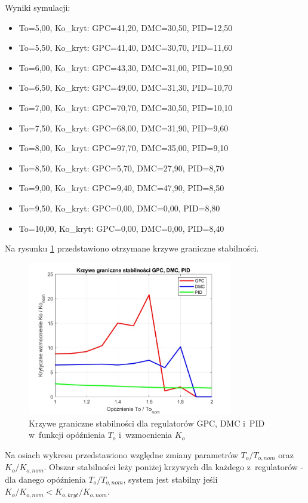 \documentclass[a4paper,titlepage,11pt,floatssmall]{mwrep}
\begin{document}
Wyniki symulacji:
\begin{itemize}
    \item To=5,00, Ko\_kryt: GPC=41,20, DMC=30,50, PID=12,50
    \item To=5,50, Ko\_kryt: GPC=41,40, DMC=30,70, PID=11,60
    \item To=6,00, Ko\_kryt: GPC=43,30, DMC=31,00, PID=10,90
    \item To=6,50, Ko\_kryt: GPC=49,00, DMC=31,30, PID=10,70
    \item To=7,00, Ko\_kryt: GPC=70,70, DMC=30,50, PID=10,10
    \item To=7,50, Ko\_kryt: GPC=68,00, DMC=31,90, PID=9,60
    \item To=8,00, Ko\_kryt: GPC=97,70, DMC=35,00, PID=9,10
    \item To=8,50, Ko\_kryt: GPC=5,70, DMC=27,90, PID=8,70
    \item To=9,00, Ko\_kryt: GPC=9,40, DMC=47,90, PID=8,50
    \item To=9,50, Ko\_kryt: GPC=0,00, DMC=0,00, PID=8,80
    \item To=10,00, Ko\_kryt: GPC=0,00, DMC=0,00, PID=8,40
\end{itemize}

Na rysunku \ref{fig:stability} przedstawiono otrzymane krzywe graniczne stabilności.

\begin{figure}[H]
    \centering
    \includegraphics[width=0.8\textwidth]{kod/wykresy/GPC_DMC_PID_stabilnosc_Ko_vs_To.jpg}
    \caption{Krzywe graniczne stabilności dla regulatorów GPC, DMC i~PID w~funkcji opóźnienia $T_o$ i~wzmocnienia $K_o$}
    \label{fig:stability}
\end{figure}

Na osiach wykresu przedstawiono względne zmiany parametrów $T_o/T_{o,nom}$ oraz $K_o/K_{o,nom}$. Obszar stabilności leży poniżej krzywych dla każdego z~regulatorów - dla danego opóźnienia $T_o/T_{o,nom}$, system jest stabilny jeśli $K_o/K_{o,nom} < K_{o,kryt}/K_{o,nom}$.
\end{document}
